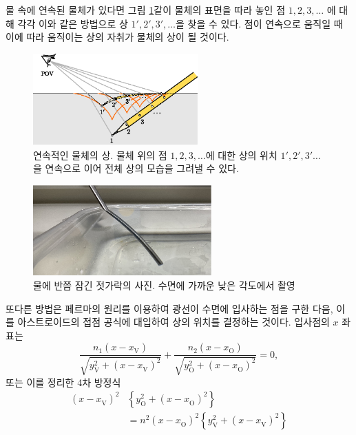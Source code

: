 \documentclass[twocolumn]{article}
\begin{document}
물 속에 연속된 물체가 있다면 그림 \ref{fig:extended_image}\와 같이 물체의 표면을 따라 놓인 점 $1, 2, 3, \dots$ 에 대해
각각 이와 같은 방법으로 상 $1', 2', 3', \dots$을 찾을 수 있다. 점이 연속으로 움직일 때 이에 따라 움직이는 상의 자취가 
물체의 상이 될 것이다.

\begin{figure}[h]
	\centering
	\includegraphics*[width=2.5in]{figs/g242.eps}
	\caption{연속적인 물체의 상. 물체 위의 점 $1, 2, 3, \dots$에 대한 상의 위치 $1', 2', 3' \dots$을 연속으로 이어 전체 상의 모습을 그려낼 수 있다.}
	\label{fig:extended_image}
\end{figure}

\begin{figure}[h]
	\centering
	\includegraphics[width=2.7in]{figs/img_1805_2.eps}
	\caption{물에 반쯤 잠긴 젓가락의 사진. 수면에 가까운 낮은 각도에서 촬영}
	\label{fig:picture}
\end{figure}


또다른 방법은 페르마의 원리를 이용하여 광선이 수면에 입사하는 점을 구한 다음, 이를 아스트로이드의 접점 공식에 대입하여 상의 위치를 결정하는 것이다.
입사점의 $x$ 좌표는
\[
\dfrac{n_1 \left( x - x_{\mathrm{V}}^{} \right)}{\sqrt{ y_{\mathrm{V}}^2 + \left( x - x_{\mathrm{V}}^{} \right)^2 }}
+\dfrac{n_2 \left( x - x_{\mathrm{O}}^{} \right)}{\sqrt{ y_{\mathrm{O}}^2 + \left( x - x_{\mathrm{O}}^{} \right)^2 }}
= 0,
\]
또는 이를 정리한 4차 방정식
\begin{equation}\label{eqn:fermat}
\begin{aligned}
	\left( x - x_{\mathrm{V}}^{} \right)^2 & \left\{ y_{\mathrm{O}}^2 + \left(x - x_{\mathrm{O}}^{} \right)^2 \right\}\\
	&= n^2 \left( x - x_{\mathrm{O}}^{} \right)^2 \left\{ y_{\mathrm{V}}^2 + \left(x - x_{\mathrm{V}}^{} \right)^2 \right\}
\end{aligned}
\end{equation}
\end{document}
